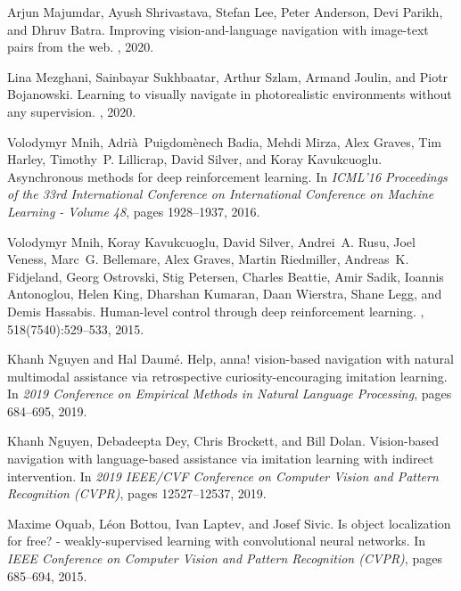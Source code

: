 \documentclass[final]{cvpr}
\begin{document}
\begin{thebibliography}{10}
    Arjun {Majumdar}, Ayush {Shrivastava}, Stefan {Lee}, Peter {Anderson}, Devi
      {Parikh}, and Dhruv {Batra}.
    \newblock Improving vision-and-language navigation with image-text pairs from
      the web.
    , 2020.
    
    Lina {Mezghani}, Sainbayar {Sukhbaatar}, Arthur {Szlam}, Armand {Joulin}, and
      Piotr {Bojanowski}.
    \newblock Learning to visually navigate in photorealistic environments without
      any supervision.
    , 2020.
    
    Volodymyr {Mnih}, Adrià~Puigdomènech {Badia}, Mehdi {Mirza}, Alex {Graves},
      Tim {Harley}, Timothy~P. {Lillicrap}, David {Silver}, and Koray
      {Kavukcuoglu}.
    \newblock Asynchronous methods for deep reinforcement learning.
    \newblock In {\em ICML'16 Proceedings of the 33rd International Conference on
      International Conference on Machine Learning - Volume 48}, pages 1928--1937,
      2016.
    
    Volodymyr {Mnih}, Koray {Kavukcuoglu}, David {Silver}, Andrei~A. {Rusu}, Joel
      {Veness}, Marc~G. {Bellemare}, Alex {Graves}, Martin {Riedmiller}, Andreas~K.
      {Fidjeland}, Georg {Ostrovski}, Stig {Petersen}, Charles {Beattie}, Amir
      {Sadik}, Ioannis {Antonoglou}, Helen {King}, Dharshan {Kumaran}, Daan
      {Wierstra}, Shane {Legg}, and Demis {Hassabis}.
    \newblock Human-level control through deep reinforcement learning.
    , 518(7540):529--533, 2015.
    
    Khanh {Nguyen} and Hal {Daumé}.
    \newblock Help, anna! vision-based navigation with natural multimodal
      assistance via retrospective curiosity-encouraging imitation learning.
    \newblock In {\em 2019 Conference on Empirical Methods in Natural Language
      Processing}, pages 684--695, 2019.
    
    Khanh {Nguyen}, Debadeepta {Dey}, Chris {Brockett}, and Bill {Dolan}.
    \newblock Vision-based navigation with language-based assistance via imitation
      learning with indirect intervention.
    \newblock In {\em 2019 IEEE/CVF Conference on Computer Vision and Pattern
      Recognition (CVPR)}, pages 12527--12537, 2019.
    
    Maxime Oquab, L{\'{e}}on Bottou, Ivan Laptev, and Josef Sivic.
    \newblock Is object localization for free? - weakly-supervised learning with
      convolutional neural networks.
    \newblock In {\em IEEE Conference on Computer Vision and Pattern Recognition
      (CVPR)}, pages 685--694, 2015.
    

\end{thebibliography}
\end{document}
